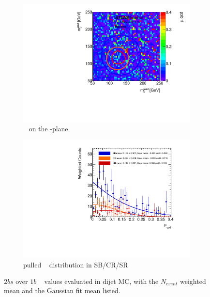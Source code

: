 \begin{figure}[htbp!]
\centering
\captionsetup{justification=centering}
	\hspace{-1cm}
    \begin{subfigure}[b]{0.4\textwidth}
        \includegraphics[width=\textwidth,angle=-90]{figures/boosted/AppendixMuqcdstudy/QCD_TwoTag_split_Incl_mH0H1.pdf}
        \caption{\muqcd~ on the \mleadJ-\msublJ plane}
        \label{fig:app-muqcd-2bs-2d-qcd}
    \end{subfigure}
    \quad \quad \quad \quad 
    \begin{subfigure}[b]{0.4\textwidth}
        \includegraphics[width=\textwidth,angle=-90]{figures/boosted/AppendixMuqcdstudy/QCD_TwoTag_split_Incl_mH0H1_pull.pdf}
        \caption{pulled \muqcd~ distribution in SB/CR/SR}
        \label{fig:app-muqcd-2bs-pull-qcd}
    \end{subfigure}
\caption{$2bs$ over $1b$ \muqcd~ values evaluated in dijet MC, with the $N_{event}$ weighted mean and the Gaussian fit mean listed.}
\label{fig:app-muqcd-2bs-qcd}
\end{figure}

